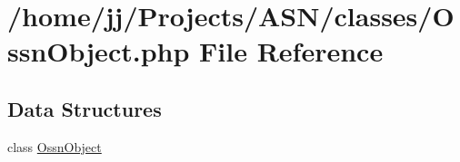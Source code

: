 \hypertarget{_ossn_object_8php}{}\section{/home/jj/\+Projects/\+A\+S\+N/classes/\+Ossn\+Object.php File Reference}
\label{_ossn_object_8php}
\subsection*{Data Structures}
\begin{DoxyCompactItemize}
\item 
class \hyperlink{class_ossn_object}{Ossn\+Object}
\end{DoxyCompactItemize}
